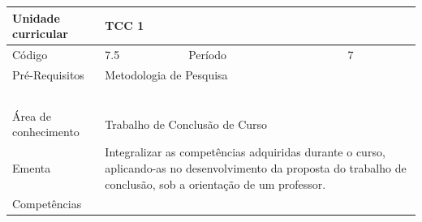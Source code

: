 \clearpage
\newpage

\begin{quadro}[ht!]
  \centering\scriptsize
\caption{Unidade Curricular TCC 1}

\begin{tabular}{|p{2.5cm}|p{2.5cm}|p{2.5cm}|p{2.5cm}|p{2.5cm}|}\hline

  Unidade curricular & \multicolumn{4}{p{10cm}|}{ TCC 1 }\\\hline
  Código & 7.5 & Período & \multicolumn{2}{p{5cm}|}{ 7 }\\\hline
  Pré-Requisitos & \multicolumn{4}{p{10cm}|}{ Metodologia de Pesquisa } \\\hline
  \cellcolor{blue1}{ CH PRESENCIAL } &
    \cellcolor{blue1}{CH EAD Síncrona} &
    \cellcolor{blue1}{CH EAD Síncrona Mediada} &
    \cellcolor{blue1}{CH EAD Assíncrona} &
    \cellcolor{blue1}{CH APCC} \\\hline
  \cellcolor{blue1}{ 0 } &
    \cellcolor{blue1}{ 0 } &
    \cellcolor{blue1}{ 30 } &
    \cellcolor{blue1}{ 0 } &
    \cellcolor{blue1}{0} \\\hline
  \cellcolor{blue1}{ CH Teórica } &
    \cellcolor{blue1}{CH Prática} &
    \cellcolor{blue1}{CH Humanidades} &
    \cellcolor{blue1}{CH Extensão} &
    \cellcolor{blue1}{CH EAD TOTAL} \\\hline
  \cellcolor{blue1}{ 15 } &
    \cellcolor{blue1}{ 15 } &
    \cellcolor{blue1}{ 0 } &
    \cellcolor{blue1}{ 0 } &
    \cellcolor{blue1}{ 30 } \\\hline
  \cellcolor{blue1}{CARGA-HORÁRIA TOTAL} & \multicolumn{4}{p{10cm}|}{ \cellcolor{blue1}{ 30 } } \\\hline
  Área de conhecimento & \multicolumn{4}{p{10cm}|}{ Trabalho de Conclusão de Curso } \\\hline
  Ementa & \multicolumn{4}{p{10cm}|}{ Integralizar as competências adquiridas durante o curso, aplicando-as no desenvolvimento da proposta do trabalho de conclusão, sob a orientação de um professor. } \\\hline
  Competências & \multicolumn{4}{p{10cm}|}{  } \\\hline


  
	\end{tabular}

\end{quadro}


\clearpage
\newpage

